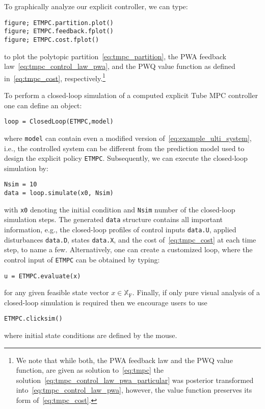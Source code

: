 \documentclass[letterpaper, 10 pt, conference]{ieeeconf}
\begin{document}
To graphically analyze our explicit controller, we can type:
\begin{lstlisting}[style=Matlab-editor]
figure; ETMPC.partition.plot()
figure; ETMPC.feedback.fplot()
figure; ETMPC.cost.fplot()
\end{lstlisting}
to plot the polytopic partition~\eqref{eq:tmpc_partition}, the PWA feedback law~\eqref{eq:tmpc_control_law_pwa}, and the PWQ value function as defined in~\eqref{eq:tmpc_cost}, respectively.\footnote{We note that while both, the PWA feedback law and the PWQ value function, are given as solution to~\eqref{eq:tmpc} the solution~\eqref{eq:tmpc_control_law_pwa_particular} was posterior transformed into~\eqref{eq:tmpc_control_law_pwa}, however, the value function preserves its form of~\eqref{eq:tmpc_cost}.}

To perform a closed-loop simulation of a computed explicit Tube MPC controller one can define an object:
\begin{lstlisting}[style=Matlab-editor]
	loop = ClosedLoop(ETMPC,model)
\end{lstlisting}
where \verb|model| can contain even a modified version of~\eqref{eq:example_ulti_system}, i.e., the controlled system can be different from the prediction model used to design the explicit policy \verb|ETMPC|. Subsequently, we can execute the closed-loop simulation by:
\begin{lstlisting}[style=Matlab-editor]
Nsim = 10
data = loop.simulate(x0, Nsim)
\end{lstlisting}	
with \verb|x0| denoting the initial condition and \verb|Nsim| number of the closed-loop simulation steps. The generated \verb|data| structure contains all important information, e.g., the closed-loop profiles of control inputs \verb|data.U|, applied disturbances \verb|data.D|, states \verb|data.X|, and the cost of~\eqref{eq:tmpc_cost} at each time step, to name a few.
Alternatively, one can create a customized loop, where the control input of \verb|ETMPC| can be obtained by typing: 
\begin{lstlisting}[style=Matlab-editor]
u = ETMPC.evaluate(x)
\end{lstlisting}
for any given feasible state vector $x\in\mathbb{X}_{\mathrm{F}}$.
%
Finally, if only pure visual analysis of a closed-loop simulation is required then we encourage users to use
\begin{lstlisting}[style=Matlab-editor]
ETMPC.clicksim()
\end{lstlisting}
where initial state conditions are defined by the mouse.
%
\end{document}
